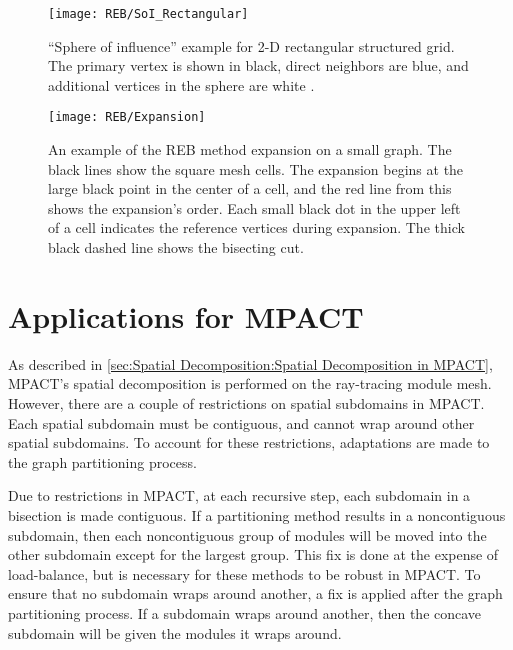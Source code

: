 {{{{        \begin{figure}
          \centering
          \texttt{[image: REB/SoI\_Rectangular]}
          \caption{
              ``Sphere of influence'' example for 2-D rectangular structured grid.
              The primary vertex is shown in black, direct neighbors are blue, and additional vertices in the sphere are white \cite{Fitzgerald2017}.
              \label{fig:Spatial Decomposition:Sphere of Influence}
          }
        \end{figure}

        \begin{figure}
          \centering
          \texttt{[image: REB/Expansion]}
          \caption{
              An example of the \ac{REB} method expansion on a small graph.
              The black lines show the square mesh cells.
              The expansion begins at the large black point in the center of a cell, and the red line from this shows the expansion's order.
              Each small black dot in the upper left of a cell indicates the reference vertices during expansion.
              The thick black dashed line shows the bisecting cut.
              \label{fig:Spatial Decomposition:REB Expansion Order}
          }
        \end{figure}

      }
    }
  }
  \section{Applications for MPACT}{\label{sec:Spatial Decomposition:Applications for MPACT}
    As described in \cref{sec:Spatial Decomposition:Spatial Decomposition in MPACT}, MPACT's spatial decomposition is performed on the ray-tracing module mesh.
    However, there are a couple of restrictions on spatial subdomains in MPACT.
    Each spatial subdomain must be contiguous, and cannot wrap around other spatial subdomains.
    To account for these restrictions, adaptations are made to the graph partitioning process.

    Due to restrictions in MPACT, at each recursive step, each subdomain in a bisection is made contiguous.
    If a partitioning method results in a noncontiguous subdomain, then each noncontiguous group of modules will be moved into the other subdomain except for the largest group.
    This fix is done at the expense of load-balance, but is necessary for these methods to be robust in MPACT.
    To ensure that no subdomain wraps around another, a fix is applied after the graph partitioning process.
    If a subdomain wraps around another, then the concave subdomain will be given the modules it wraps around.

}}
